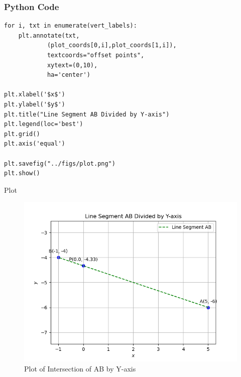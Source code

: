 \documentclass{beamer}
\begin{document}
\begin{frame}[fragile]
    \frametitle{Python Code}
    \begin{lstlisting}
for i, txt in enumerate(vert_labels):
    plt.annotate(txt,
            (plot_coords[0,i],plot_coords[1,i]),
            textcoords="offset points",
            xytext=(0,10),
            ha='center')

plt.xlabel('$x$')
plt.ylabel('$y$')
plt.title("Line Segment AB Divided by Y-axis")
plt.legend(loc='best')
plt.grid()
plt.axis('equal')

plt.savefig("../figs/plot.png")
plt.show()
    \end{lstlisting}
\end{frame}

\begin{frame}{Plot}
    \begin{figure}
        \centering
        \includegraphics[width=0.5\columnwidth]{../figs/plot.png}
        \caption{Plot of Intersection of AB by Y-axis}
        \label{fig:fig}
    \end{figure}
\end{frame}
\end{document}
